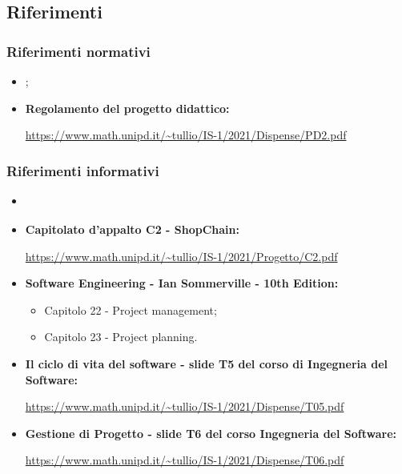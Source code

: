 \subsection{Riferimenti} \label{subsection:intro_riferimenti}
\subsubsection{Riferimenti normativi} \label{subsubsection:intro_riferimenti_normativi}
\begin{itemize}
  \item \textbf{\docNameVersionNdP};
  \item \textbf{Regolamento del progetto didattico:}
  \begin{center}
    \url{https://www.math.unipd.it/~tullio/IS-1/2021/Dispense/PD2.pdf}
  \end{center}
\end{itemize}
\subsubsection{Riferimenti informativi} \label{subsubsection:intro_riferimenti_informativi}
\begin{itemize}
  \item \textbf{\docNameVersionAdR}
  \item \textbf{Capitolato d'appalto C2 - ShopChain:}
  \begin{center}
    \url{https://www.math.unipd.it/~tullio/IS-1/2021/Progetto/C2.pdf}
  \end{center}
  \item \textbf{Software Engineering - Ian Sommerville - 10th Edition:}
  \begin{itemize}
    \item Capitolo 22 - Project management;
    \item Capitolo 23 - Project planning.
  \end{itemize}
  \item \textbf{Il ciclo di vita del software - slide T5 del corso di Ingegneria del Software:}
  \begin{center}
    \url{https://www.math.unipd.it/~tullio/IS-1/2021/Dispense/T05.pdf}
  \end{center}
  \item \textbf{Gestione di Progetto - slide T6 del corso Ingegneria del Software:}
  \begin{center}
    \url{https://www.math.unipd.it/~tullio/IS-1/2021/Dispense/T06.pdf}
  \end{center}
\end{itemize}

